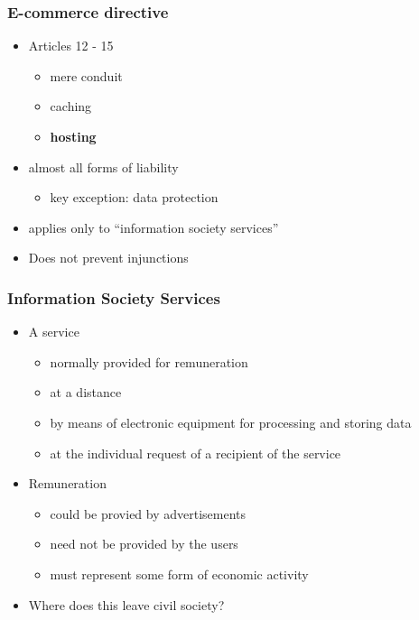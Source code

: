 \documentclass[ignorenonframetext,]{beamer}
\begin{document}
\begin{frame}
\frametitle{E-commerce directive}

\begin{itemize}
\item  Articles 12 - 15
  \begin{itemize}
  \item mere conduit
  \item caching
  \item {\bf hosting}
  \end{itemize}

  \item almost all forms of liability
    \begin{itemize}
    \item key exception: data protection
    \end{itemize}
  \item applies only to ``information society services''
  \item  Does not prevent injunctions

\end{itemize}

\end{frame}

\begin{frame}
  \frametitle{Information Society Services}
  \begin{itemize}
  \item A service
    \begin{itemize}
    \item normally provided for remuneration
    \item at a distance
    \item by means of electronic equipment for processing and storing data
    \item at the individual request of a recipient of the service
    \end{itemize}
  \item Remuneration
    \begin{itemize}
    \item could be provied by advertisements
    \item need not be provided by the users
    \item must represent some form of economic activity
    \end{itemize}
  \item Where does this leave civil society?
  \end{itemize}
\end{frame}
\end{document}
